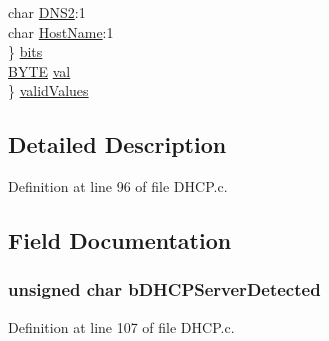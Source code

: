 \begin{DoxyCompactItemize}
\begin{tabbing}
\>\>char \hyperlink{struct_d_h_c_p___c_l_i_e_n_t___v_a_r_s_a32a26844e694ebda11e8fa4bc9303864}{DNS2}:1\\
\>\>char \hyperlink{struct_d_h_c_p___c_l_i_e_n_t___v_a_r_s_ab16de4f3e4c6b7e5e291528b069414cd}{HostName}:1\\
\>\} \hyperlink{struct_d_h_c_p___c_l_i_e_n_t___v_a_r_s_a2d001130dc2cf59cdb816d6c1d1b8a5d}{bits}\\
\>\hyperlink{_generic_type_defs_8h_a4ae1dab0fb4b072a66584546209e7d58}{BYTE} \hyperlink{struct_d_h_c_p___c_l_i_e_n_t___v_a_r_s_a5986ea8162aa0f6608b36b20964044dd}{val}\\
\} \hyperlink{struct_d_h_c_p___c_l_i_e_n_t___v_a_r_s_aac5486c73ada70d2692a5e4d89ec3028}{validValues}\\

\end{tabbing}\end{DoxyCompactItemize}


\subsection{Detailed Description}


Definition at line 96 of file D\+H\+C\+P.\+c.



\subsection{Field Documentation}
\hypertarget{struct_d_h_c_p___c_l_i_e_n_t___v_a_r_s_a723ee5c123c6c0186388af98333428be}{}
\subsubsection[{b\+D\+H\+C\+P\+Server\+Detected}]{\setlength{\rightskip}{0pt plus 5cm}unsigned char b\+D\+H\+C\+P\+Server\+Detected}\label{struct_d_h_c_p___c_l_i_e_n_t___v_a_r_s_a723ee5c123c6c0186388af98333428be}


Definition at line 107 of file D\+H\+C\+P.\+c.

\hypertarget{struct_d_h_c_p___c_l_i_e_n_t___v_a_r_s_accc0eabd359c539ae32cdbee2d8e051a}{}
